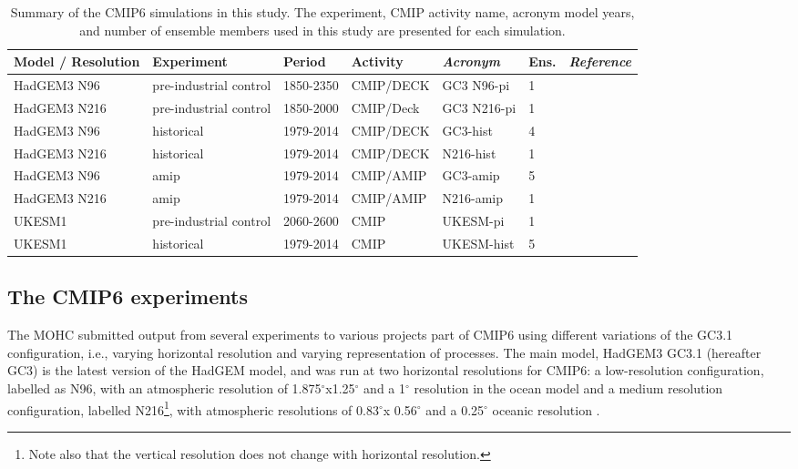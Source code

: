 \begin{table}
\small
\caption{Summary of the CMIP6 simulations in this study. The experiment, CMIP activity name, acronym model years, and number of ensemble members used in this study are presented for each simulation.}
\begin{tabular}{p{}|p{2.3cm}p{1.7cm}p{}p{}p{0.9cm}p{}} \label{tab:Sexps} \small
 Model / Resolution & Experiment & Period & Activity & \textit{Acronym}  & Ens. & \textit{Reference}                 \\ \hline \hline

HadGEM3 N96    &  pre-industrial control  & 1850-2350 & CMIP/DECK & GC3 N96-pi      & 1 &   \citep{gc3pi}                          \\
HadGEM3 N216  &  pre-industrial control & 1850-2000        & CMIP/Deck & GC3 N216-pi   & 1 & \citep{n216pi}      \\
HadGEM3 N96    &  historical & 1979-2014       & CMIP/DECK & GC3-hist     &  4 & \citep{gc3hist}                          \\
HadGEM3 N216   &  historical & 1979-2014        & CMIP/DECK & N216-hist   & 1 & \citep{n216pi}      \\
HadGEM3 N96   & amip  & 1979-2014 & CMIP/AMIP  & GC3-amip   & 5  &   \citep{gc3amip}                          \\
HadGEM3 N216   & amip  & 1979-2014 & CMIP/AMIP  & N216-amip   & 1  &   \citep{gc3amip}                          \\
UKESM1   &  pre-industrial control  & 2060-2600       & CMIP & UKESM-pi      & 1 & \citep{ukesmpi}            \\
UKESM1   &  historical  & 1979-2014       & CMIP & UKESM-hist & 5     &  \citep{ukesmhist}            \\
\end{tabular}
\end{table}

\subsection{The CMIP6 experiments}\label{sq:cmip6exp}

The MOHC submitted output from several experiments to various projects part of CMIP6 using different variations of the GC3.1 configuration, i.e., varying horizontal resolution and varying representation of processes. 
The main model, HadGEM3 GC3.1 (hereafter GC3) is the latest version of the HadGEM model, and was run at two horizontal resolutions for CMIP6: a low-resolution configuration, labelled as N96, with an atmospheric resolution of 1.875$^\circ$x1.25$^\circ$ and a 1$^\circ$ resolution in the ocean model and a medium resolution configuration, labelled N216\footnote{Note also that the vertical resolution does not change with horizontal resolution. }, with atmospheric resolutions of 0.83$^\circ$x 0.56$^\circ$ and a 0.25$^\circ$ oceanic resolution \citep{menary2018}. 

